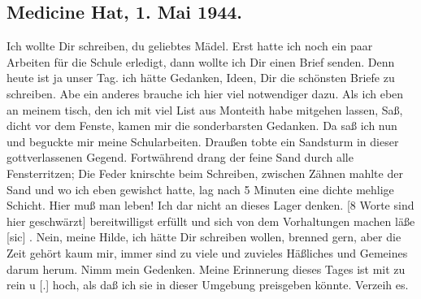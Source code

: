 \subsection{Medicine Hat, 1. Mai 1944.}

Ich wollte Dir schreiben, du geliebtes M\"{a}del.
Erst hatte ich noch ein paar Arbeiten f\"{u}r die Schule erledigt, dann wollte ich Dir einen Brief senden.
Denn heute ist ja unser Tag.
ich h\"{a}tte Gedanken, Ideen, Dir die sch\"{o}nsten Briefe zu schreiben.
Abe ein anderes brauche ich hier viel notwendiger dazu.
Als ich eben an meinem tisch, den ich mit viel List aus Monteith habe mitgehen lassen, Sa{\ss}, dicht vor dem Fenste, kamen mir die sonderbarsten Gedanken.
Da sa{\ss} ich nun und beguckte mir meine Schularbeiten.
Drau{\ss}en tobte ein Sandsturm in dieser gottverlassenen Gegend.
Fortw\"{a}hrend drang der feine  Sand durch alle Fensterritzen; Die Feder knirschte beim Schreiben, zwischen Z\"{a}hnen mahlte der Sand und wo ich eben gewishct hatte, lag nach 5 Minuten eine dichte mehlige Schicht.
Hier mu{\ss} man leben!
Ich dar nicht an dieses Lager denken.
{\color{red} [8 Worte sind hier geschw\"{a}rzt] }
bereitwilligst erf\"{u}llt und sich von dem Vorhaltungen machen l\"{a}{\ss}e{\color{red} [sic] }.
Nein, meine Hilde, ich h\"{a}tte Dir schreiben wollen, brenned gern, aber die Zeit geh\"{o}rt kaum mir, immer sind zu viele und zuvieles H\"{a}{\ss}liches und Gemeines darum herum.
Nimm mein Gedenken.
Meine Erinnerung dieses Tages ist mit zu rein u{\color{red} [.] } hoch, als da{\ss} ich sie in dieser Umgebung preisgeben k\"{o}nnte.
Verzeih es.

\clearpage
